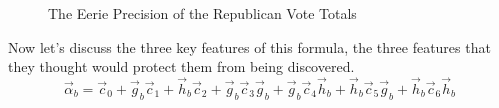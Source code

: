 \begin{figure}[bp!]
\begin{center}
\caption{The Eerie Precision of the Republican Vote Totals}
\noindent{}
\end{center}
\end{figure}
\newpage
Now let's discuss the three key features of this formula, the three features that they thought would protect them from being discovered.
$$\vec{\alpha}_b=\vec{c}_{0}+\vec{g}_{b}\vec{c}_{1}+\vec{h}_{b}\vec{c}_{2}+\vec{g}_{b}\vec{c}_{3}\vec{g}_{b}+\vec{g}_{b}\vec{c}_{4}\vec{h}_{b}+\vec{h}_{b}\vec{c}_{5}\vec{g}_{b}+\vec{h}_{b}\vec{c}_{6}\vec{h}_{b}$$


